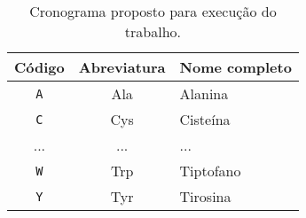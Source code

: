 \begin{table}[!t]
\begin{center}
    \begin{tabular}{c|c|l}
	 \hline
	 Código & Abreviatura & Nome completo \\ \hline
     \texttt{A} & Ala & Alanina \\
     \texttt{C} & Cys & Cisteína \\
     ...        & ... & ... \\
     \texttt{W} & Trp & Tiptofano \\
     \texttt{Y} & Tyr & Tirosina \\ \hline
    \end{tabular}
  \caption{Cronograma proposto para execução do trabalho.}
  \label{tab:amino_acidos}
\end{center}
\end{table}
